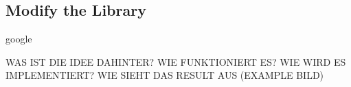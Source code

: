 \subsection{Modify the Library} \label{subsection:counter-modifications-library}
google

WAS IST DIE IDEE DAHINTER? WIE FUNKTIONIERT ES? WIE WIRD ES IMPLEMENTIERT? WIE SIEHT DAS RESULT AUS (EXAMPLE BILD)\newline
